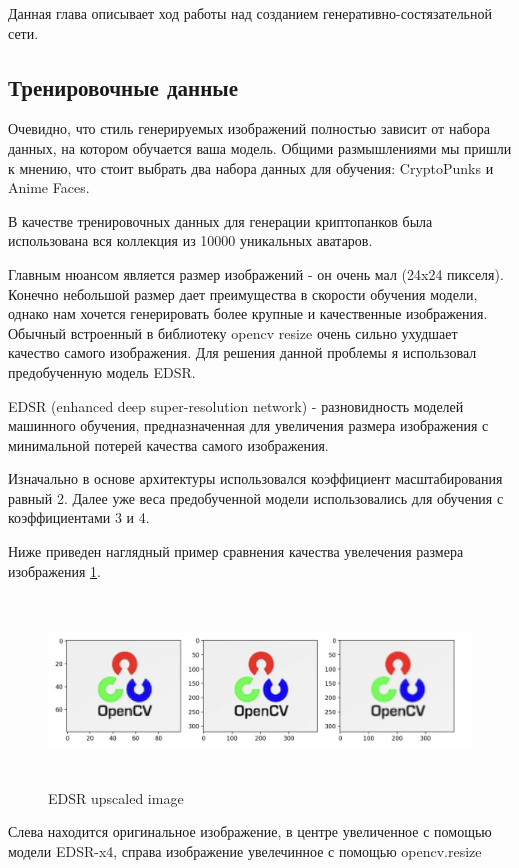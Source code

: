 Данная глава описывает ход работы над созданием генеративно-состязательной сети.

\subsection{Тренировочные данные}

Очевидно, что стиль генерируемых изображений полностью зависит от набора данных, на котором обучается ваша модель. Общими размышлениями мы пришли к мнению, что стоит выбрать два набора данных для обучения: CryptoPunks и Anime Faces.

В качестве тренировочных данных для генерации криптопанков была использована вся коллекция из 10000 уникальных аватаров\cite{cryptopunks_dataset}.


Главным нюансом является размер изображений - он очень мал (24x24 пикселя). Конечно небольшой размер дает преимущества в скорости обучения модели, однако нам хочется генерировать более крупные и качественные изображения.
Обычный встроенный в библиотеку opencv resize очень сильно ухудшает качество самого изображения. Для решения данной проблемы я использовал предобученную модель EDSR\cite{EDSR}.

\begin{definition}
    EDSR (enhanced deep super-resolution network) - разновидность моделей машинного обучения, предназначенная для увеличения размера изображения с минимальной потерей качества самого изображения.
\end{definition}

Изначально в основе архитектуры использовался коэффициент масштабирования равный 2. Далее уже веса предобученной модели использовались для обучения с коэффициентами 3 и 4.

Ниже приведен наглядный пример сравнения качества увелечения размера изображения {\color{blue} \ref{fig.EDSR_difference}}.
\begin{figure}
    \centering
    \includegraphics[height=50mm]{fig/EDSR_difference.png}
    \caption{EDSR upscaled image}
    \label{fig.EDSR_difference}
\end{figure}
Слева находится оригинальное изображение, в центре увеличенное с помощью модели EDSR-x4, справа изображение увелечинное с помощью opencv.resize

